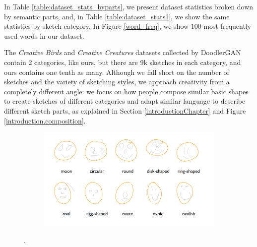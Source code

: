 In Table \ref{table:dataset_stats_byparts}, we present dataset statistics broken down by semantic parts, and, in Table \ref{table:dataset_stats1}, we show the same statistics by sketch category. In Figure \ref{word_freq}, we show 100 most frequently used words in our dataset. 

The \textit{Creative Birds} and \textit{Creative Creatures} datasets collected by DoodlerGAN \citep{doodlerGAN} contain 2 categories, like ours, but there are 9k sketches in each category, and ours contains one tenth as many. Although we fall short on the number of sketches and the variety of sketching styles, we approach creativity from a completely different angle: we focus on how people compose similar basic shapes to create sketches of different categories and adapt similar language to describe different sketch parts, as explained in Section \ref{introductionChapter} and Figure \ref{introduction.composition}.  




\begin{figure}[!htb]
\begin{subfigure}{\textwidth}
\centering
\includegraphics[width=\linewidth]{data_collection/summary/circles_descriptions.png}  
\end{subfigure}
\caption{.}
\label{datasummary.circles.varied_language}
\end{figure}

